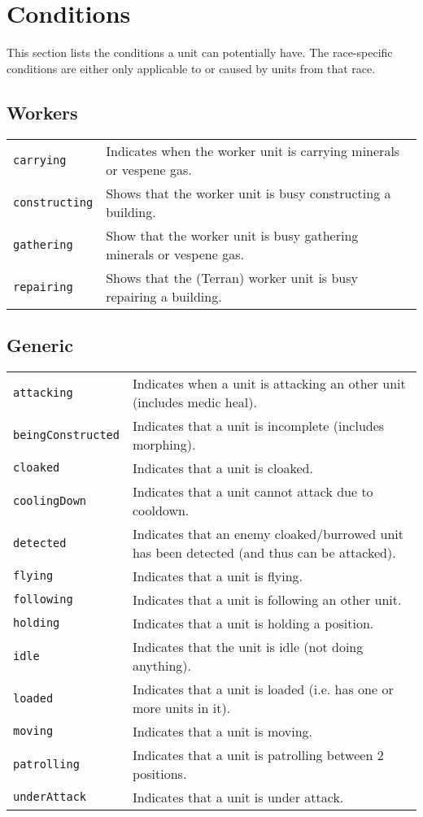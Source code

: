 \newpage
\section{Conditions}
\label{conditions}
This section lists the conditions a unit can potentially have. The race-specific conditions are either only applicable to or caused by units from that race.

\subsection{Workers}
\begin{tabularx}{\textwidth}{lX}
 \verb|carrying| & Indicates when the worker unit is carrying minerals or vespene gas. \\
 \verb|constructing| & Shows that the worker unit is busy constructing a building. \\
 \verb|gathering| & Show that the worker unit is busy gathering minerals or vespene gas. \\
 \verb|repairing| & Shows that the (Terran) worker unit is busy repairing a building.
\end{tabularx}

\subsection{Generic}
\begin{tabularx}{\textwidth}{lX}
 \verb|attacking| & Indicates when a unit is attacking an other unit (includes medic heal). \\
 \verb|beingConstructed| & Indicates that a unit is incomplete (includes morphing). \\
 \verb|cloaked| & Indicates that a unit is cloaked. \\
 \verb|coolingDown| & Indicates that a unit cannot attack due to cooldown. \\
 \verb|detected| & Indicates that an enemy cloaked/burrowed unit has been detected (and thus can be attacked). \\
 \verb|flying| & Indicates that a unit is flying. \\
 \verb|following| & Indicates that a unit is following an other unit. \\
 \verb|holding| & Indicates that a unit is holding a position. \\
 \verb|idle| & Indicates that the unit is idle (not doing anything). \\
 \verb|loaded| & Indicates that a unit is loaded (i.e. has one or more units in it). \\
 \verb|moving| & Indicates that a unit is moving. \\
 \verb|patrolling| & Indicates that a unit is patrolling between 2 positions. \\
 \verb|underAttack| & Indicates that a unit is under attack.
\end{tabularx}

